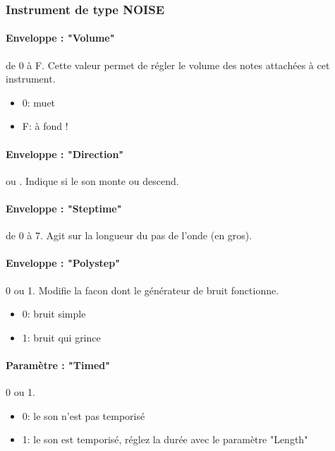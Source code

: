 \documentclass[12pt,a4paper]{article}
\begin{document}
    \subsubsection{Instrument de type NOISE}


    \paragraph{Enveloppe : "Volume"} de 0 à F.
    Cette valeur permet de régler le volume des notes attachées à cet instrument.
    \medskip

    \begin{itemize}
        \item{0: muet}
        \item{F: à fond !}
    \end{itemize}

    \paragraph{Enveloppe : "Direction"}  ou .
        Indique si le son monte ou descend.

    \paragraph{Enveloppe : "Steptime"} de 0 à 7.
    Agit sur la longueur du pas de l'onde (en gros).

    \paragraph{Enveloppe : "Polystep"} 0 ou 1.
    Modifie la facon dont le générateur de bruit fonctionne.
    \medskip

    \begin{itemize}
        \item{0: bruit simple}
        \item{1: bruit qui grince}
    \end{itemize}

    \paragraph{Paramètre : "Timed"} 0 ou 1.
    \medskip

    \begin{itemize}
            \item{0: le son n'est pas temporisé}
            \item{1: le son est temporisé, réglez la durée avec le paramètre "Length"}
        \end{itemize}
\end{document}
